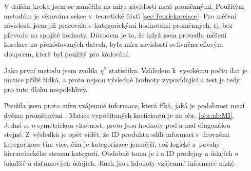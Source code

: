 V dalším kroku jsem se zaměřila na míru závislosti mezi proměnnými. Použitým metodám je věnována sekce v~teoretické části \ref{sec:Teoriekorelace}. 
Pro měření závislosti jsem již pracovala s~kategorickými hodnotami proměnných, tj. bez převodu na spojité hodnoty. Důvodem je to, že když jsem provedla měření korelace na překódovaných datech, byla míra zavislosti ovlivněna cílovým sloupcem, který byl použitý pro kódování.

 
Jako první metodu jsem zvolila  $\chi^2$ statistiku. Vzhledem k~vysokému počtu dat je matice příliš řídká, a proto nejsou výsledné hodnoty vypovídající a test je tedy pro tuto úlohu nespolehlivý.

Použila jsem proto míru vzájemné informace, která říká, jaká je podobnost mezi dvěma proměnnými \cite{bib:scikit}.
Matice vypočítaných koeficientů je na obr. \ref*{obr:nb:MI}. Jedná se o symetrickou vlastnost, proto jsou hodnoty pod a nad diagonálou stejné. Z~výsledků je opět vidět, že ID produktu sdílí informaci s~úrovněmi kategorizace tím více, čím je kategorizace jemnější, což logické z~povahy hierarchického stromu kategorií. Obdobně tomu je i u ID prodejny a údajích o lokalitě a datumových údajích. Jinak jsou hdonoty vzájemné informace nízké.


